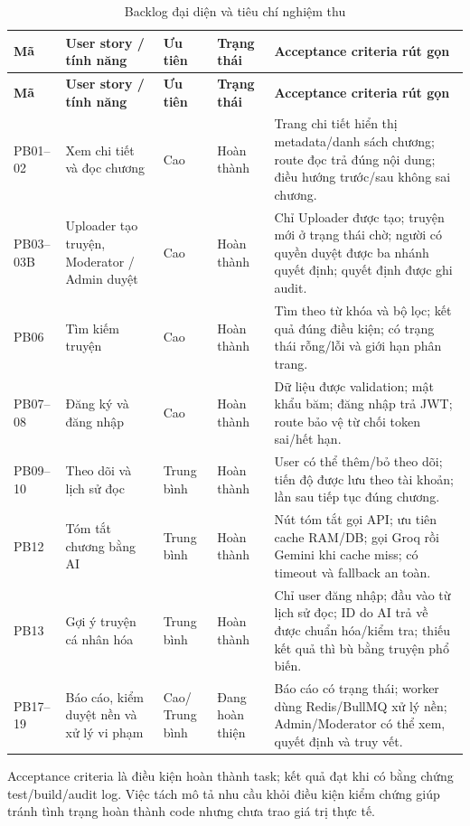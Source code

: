 \begin{longtable}{|>{\centering\arraybackslash}p{1.15cm}|>{\RaggedRight\arraybackslash}p{4.1cm}|>{\centering\arraybackslash}p{1.5cm}|>{\centering\arraybackslash}p{1.65cm}|>{\RaggedRight\arraybackslash}p{6.4cm}|}
\caption{Backlog đại diện và tiêu chí nghiệm thu}\label{tab:backlog-ac}\\
\hline
\textbf{Mã} & \textbf{User story / tính năng} & \textbf{Ưu tiên} & \textbf{Trạng thái} & \textbf{Acceptance criteria rút gọn} \\
\hline
\endfirsthead
\hline
\textbf{Mã} & \textbf{User story / tính năng} & \textbf{Ưu tiên} & \textbf{Trạng thái} & \textbf{Acceptance criteria rút gọn} \\
\hline
\endhead
PB01--02 & Xem chi tiết và đọc chương & Cao & Hoàn thành & Trang chi tiết hiển thị metadata/danh sách chương; route đọc trả đúng nội dung; điều hướng trước/sau không sai chương. \\
\hline
PB03--03B & Uploader tạo truyện, Moderator / Admin duyệt & Cao & Hoàn thành & Chỉ Uploader được tạo; truyện mới ở trạng thái chờ; người có quyền duyệt được ba nhánh quyết định; quyết định được ghi audit. \\
\hline
PB06 & Tìm kiếm truyện & Cao & Hoàn thành & Tìm theo từ khóa và bộ lọc; kết quả đúng điều kiện; có trạng thái rỗng/lỗi và giới hạn phân trang. \\
\hline
PB07--08 & Đăng ký và đăng nhập & Cao & Hoàn thành & Dữ liệu được validation; mật khẩu băm; đăng nhập trả JWT; route bảo vệ từ chối token sai/hết hạn. \\
\hline
PB09--10 & Theo dõi và lịch sử đọc & Trung bình & Hoàn thành & User có thể thêm/bỏ theo dõi; tiến độ được lưu theo tài khoản; lần sau tiếp tục đúng chương. \\
\hline
PB12 & Tóm tắt chương bằng AI & Trung bình & Hoàn thành & Nút tóm tắt gọi API; ưu tiên cache RAM/DB; gọi Groq rồi Gemini khi cache miss; có timeout và fallback an toàn. \\
\hline
PB13 & Gợi ý truyện cá nhân hóa & Trung bình & Hoàn thành & Chỉ user đăng nhập; đầu vào từ lịch sử đọc; ID do AI trả về được chuẩn hóa/kiểm tra; thiếu kết quả thì bù bằng truyện phổ biến. \\
\hline
PB17--19 & Báo cáo, kiểm duyệt nền và xử lý vi phạm & Cao/ Trung bình & Đang hoàn thiện & Báo cáo có trạng thái; worker dùng Redis/BullMQ xử lý nền; Admin/Moderator có thể xem, quyết định và truy vết. \\
\hline
\end{longtable}

Acceptance criteria là điều kiện hoàn thành task; kết quả đạt khi có bằng chứng test/build/audit log. Việc tách mô tả nhu cầu khỏi điều kiện kiểm chứng giúp tránh tình trạng hoàn thành code nhưng chưa trao giá trị thực tế.
